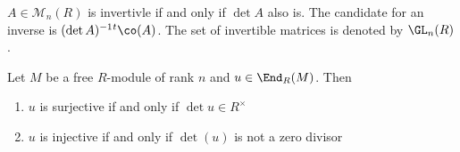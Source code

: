 \begin{cor}
$A \in  \mathcal  M_n(R)$ is invertivle if and only if $\det A$ also is. The candidate for an inverse is  $(\det A)^{-1} \transpose \co(A)$. The set of invertible matrices is denoted by $\GL_n(R)$.
\end{cor}

\begin{thm}
Let $M$ be a free $R$-module of rank $n$ and $u \in  \End_R(M)$. Then
\begin{enumerate}
    \item $u$ is surjective  if and only if $\det u \in  R^\times$
    \item $u$ is injective  if and only if $\det (u)$ is not a zero divisor
\end{enumerate}
\end{thm}
